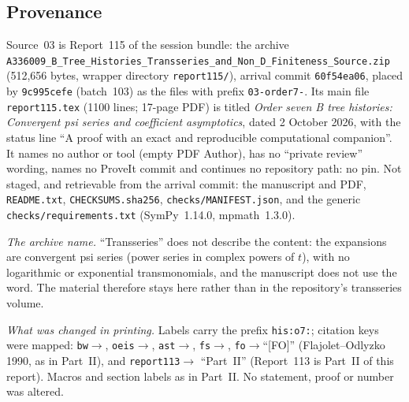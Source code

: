 \documentclass[11pt]{article}
\theoremstyle{remark}\newtheorem{remark}[theorem]{Remark}
\numberwithin{equation}{section}
\begin{document}
\subsection{Provenance}\label{his:o7:sec:provenance}
{\sloppy{}\relax Source~03 is Report~115 of the session bundle: the archive \texttt{A336009\_B\_Tree\_\allowbreak Histories\_\allowbreak Transseries\_and\_\allowbreak Non\_D\_Finiteness\_\allowbreak Source.zip} (512{,}656 bytes, wrapper directory \texttt{report115/}), arrival commit \texttt{60f54ea06}, placed by \texttt{9c995cefe} (batch~103) as the files with prefix \texttt{03-order7-}. Its main file \texttt{report115.tex} (1100 lines; 17-page PDF) is titled \emph{Order seven B tree histories: Convergent psi series and coefficient asymptotics}, dated 2 October 2026, with the status line ``A proof with an exact and reproducible computational companion''. It names no author or tool (empty PDF Author), has no ``private review'' wording, names no ProveIt commit and continues no repository path: no pin. Not staged, and retrievable from the arrival commit: the manuscript and PDF, \texttt{README.txt}, \texttt{CHECKSUMS.sha256}, \texttt{checks/MANIFEST.json}, and the generic \texttt{checks/requirements.txt} (SymPy~1.14.0, mpmath~1.3.0).\par}

\emph{The archive name.} ``Transseries'' does not describe the content: the expansions are convergent psi series (power series in complex powers of $t$), with no logarithmic or exponential transmonomials, and the manuscript does not use the word. The material therefore stays here rather than in the repository's transseries volume.

\emph{What was changed in printing.} Labels carry the prefix \texttt{his:o7:}; citation keys were mapped: \texttt{bw}$\to$\cite{bw2026}, \texttt{oeis}$\to$\cite{oeisr4}, \texttt{ast}$\to$\cite{astashova2013}, \texttt{fs}$\to$\cite{fs2009}, \texttt{fo}$\to$``[FO]'' (Flajolet--Odlyzko 1990, as in Part~II), and \texttt{report113}$\to$ ``Part~II'' (Report~113 is Part~II of this report). Macros and section labels as in Part~II. No statement, proof or number was altered.
\end{document}
